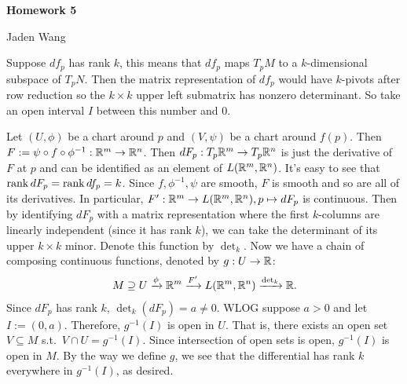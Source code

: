 \documentclass[12pt]{article}
\begin{document}
\centerline {\textsf{\textbf{\LARGE{Homework 5}}}}
\centerline {Jaden Wang}
\vspace{.15in}
\begin{problem}[9.1]
Suppose $ df_p $ has rank  $ k$, this means that  $ df_p$ maps  $ T_pM$ to a  $ k$-dimensional subspace of  $ T_pN$. Then the matrix representation of  $ df_p$ would have $ k$-pivots after row reduction so the  $ k \times k$ upper left submatrix has nonzero determinant. So take an open interval $ I$ between this number and 0.

Let $ (U,\phi)$ be a chart around $ p$ and $ (V,\psi)$ be a chart around $ f(p)$. Then $F:= \psi \circ f \circ \phi ^{-1}: \mathbb{R}^{m} \to \mathbb{R}^{n}$. Then $ dF_p: T_p \mathbb{R}^{m} \to T_p \mathbb{R}^{n}$ is just the derivative of $ F$ at  $ p$ and can be identified as an element of $ L(\mathbb{R}^{m}, \mathbb{R}^{n})$. It's easy to see that $\operatorname{rank} dF_p = \operatorname{rank} df_p = k$. Since $ f,\phi ^{-1},\psi$ are smooth, $ F$ is smooth and so are all of its derivatives. In particular, $ F': \mathbb{R}^{m} \to L(\mathbb{R}^{m}, \mathbb{R}^{n}), p \mapsto dF_p$ is continuous. Then by identifying $ dF_p$ with a matrix representation where the first $ k$-columns are linearly independent (since it has rank $ k$), we can take the determinant of its upper $ k\times k$ minor. Denote this function by $ \det_k $. Now we have a chain of composing continuous functions, denoted by $ g: U \to \mathbb{R}$:
\begin{align*}
	M \supseteq U \xrightarrow{ \phi} \mathbb{R}^{m} \xrightarrow{ F'} L(\mathbb{R}^{m}, \mathbb{R}^{n}) \xrightarrow{ \det_k}   \mathbb{R} .
\end{align*}
Since $ dF_p$ has rank  $ k$, $ \det_k(dF_p) = a \neq 0$. WLOG suppose $ a>0$ and let  $ I:=(0,a)$. Therefore, $ g^{-1}(I)$ is open in $ U$. That is, there exists an open set $ V \subseteq M$ s.t.\ $ V \cap U = g^{-1}(I)$. Since intersection of open sets is open, $ g^{-1}(I)$ is open in $ M$. By the way we define $ g$, we see that the differential has rank  $ k$ everywhere in $ g^{-1}(I)$, as desired.
\end{problem}
\end{document}
